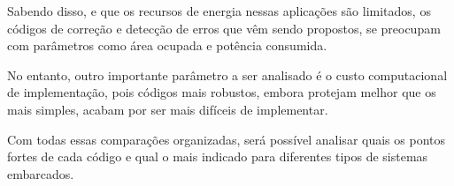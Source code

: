 Sabendo disso, e que os recursos de energia nessas aplicações são limitados, os códigos de correção e detecção de erros que vêm sendo propostos, se preocupam com parâmetros como área ocupada e potência consumida.

No entanto, outro importante parâmetro a ser analisado é o custo computacional de implementação, pois códigos mais robustos, embora protejam melhor que os mais simples, acabam por ser mais difíceis de implementar.

Com todas essas comparações organizadas, será possível analisar quais os pontos fortes de cada código e qual o mais indicado para diferentes tipos de sistemas embarcados.
